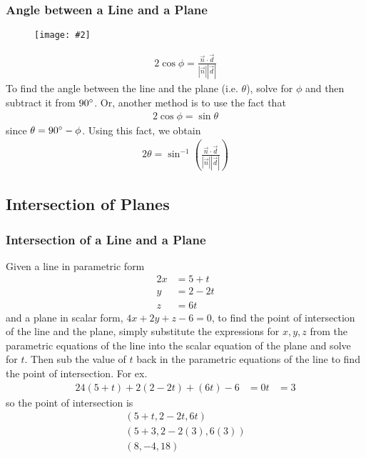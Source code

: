 \documentclass{report}
\newcommand{\diagram}[2][0.5]{
	\begin{figure}[H]
		\centering
		\texttt{[image: \#2]}
	\end{figure}
	}
\theoremstyle{definition}
\numberwithin{equation}{section}
\begin{document}
\subsubsection{Angle between a Line and a Plane}
\diagram{angle-between-line-and-plane}
\begin{alignat}{2}{}
	\cos \phi = \frac{\vec n \cdot \vec d}{|\vec n||\vec d|}
\end{alignat}
To find the angle between the line and the plane (i.e. $\theta$), solve for $\phi$ and then subtract it from $90 \degree$. Or, another method is to use the fact that
\begin{alignat}{2}{}
	\cos \phi = \sin \theta
\end{alignat}
since $\theta = 90 \degree - \phi$. Using this fact, we obtain
\begin{alignat}{2}{}
	\theta = \sin^{-1}\left(\frac{\vec n \cdot \vec d}{|\vec n||\vec d|} \right)
\end{alignat}



\subsection{Intersection of Planes}

\subsubsection{Intersection of a Line and a Plane}
Given a line in parametric form
\begin{alignat*}{2}{}
	x &= 5 + t \\
	y &= 2 - 2t \\
	z &= 6t
\end{alignat*}
and a plane in scalar form, $4x+2y+z-6=0$, to find the point of intersection of the line and the plane, simply substitute the expressions for $x,y,z$ from the parametric equations of the line into the scalar equation of the plane and solve for $t$. Then sub the value of $t$ back in the parametric equations of the line to find the point of intersection. For ex.
\begin{alignat*}{2}{}
	4(5+t)+2(2-2t)+(6t)-6&=0
	t&=3
\end{alignat*}
so the point of intersection is
\begin{gather*}
	(5+t,2-2t,6t) \\
	(5+3,2-2(3),6(3)) \\
	(8,-4,18)
\end{gather*}
\end{document}
